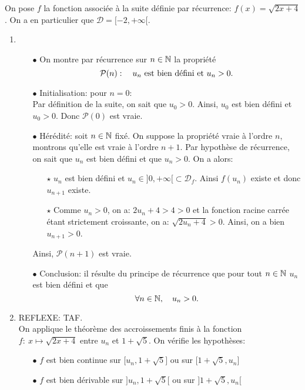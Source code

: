 \documentclass[a4paper, 11pt,reqno]{article}
\begin{document}
\begin{correction}
	On pose $f$ la fonction associ\'ee \`a la suite d\'efinie par r\'ecurrence: $f(x)=\sqrt{2x+4}$. On a en particulier que $\mathcal{D}=\lbrack -2,+\infty\lbrack$.
	\begin{enumerate}
		\item \begin{itemize}
			      \item[$\bullet$] On montre par r\'ecurrence sur $n\in\mathbb{N}$ la propri\'et\'e
			            $$\mathcal{P}(n):\quad u_n\ \hbox{est bien d\'efini et}\ u_n>0.$$
			      \item[$\bullet$]  Initialisation: pour $n=0$:\\
			            \noindent Par d\'efinition de la suite, on sait que $u_0>0$. Ainsi, $u_0$ est bien d\'efini et $u_0>0$. Donc $\mathcal{P}(0)$ est vraie.
			      \item[$\bullet$] H\'er\'edit\'e: soit $n\in\mathbb{N}$ fix\'e. On suppose la propri\'et\'e vraie \`a l'ordre $n$, montrons qu'elle est vraie \`a l'ordre $n+1$. Par hypoth\`ese de r\'ecurrence, on sait que $u_n$ est bien d\'efini et que $u_n>0$. On a alors:
			            \begin{itemize}
				            \item[$\star$] $u_n$ est bien d\'efini et $u_n\in\rbrack 0,+\infty\lbrack\subset\mathcal{D}_f$. Ainsi $f(u_n)$ existe et donc $u_{n+1}$ existe.
				            \item[$\star$]  Comme $u_n>0$, on a: $2u_n+4>4>0$ et la fonction racine carr\'ee \'etant strictement croissante, on a: $\sqrt{2u_n+4}>0$. Ainsi, on a bien $u_{n+1}>0$.
			            \end{itemize}
			            Ainsi, $\mathcal{P}(n+1)$ est vraie.
			      \item[$\bullet$]  Conclusion: il r\'esulte du principe de r\'ecurrence que pour tout $n\in\mathbb{N}$ $u_n$ est bien d\'efini et que
			            $$\forall n\in\mathbb{N},\quad u_n>0.$$
		      \end{itemize}
		\item REFLEXE: TAF.\\
		      \noindent On applique le th\'eor\`eme des accroissements finis \`a la fonction $f:\ x\mapsto \sqrt{2x+4}$ entre $u_n$ et $1+\sqrt{5}$. On v\'erifie les hypoth\`eses:
		      \begin{itemize}
			      \item[$\bullet$] $f$ est bien continue sur $\lbrack u_n,1+\sqrt{5}\rbrack$ ou sur $\lbrack 1+\sqrt{5},u_n\rbrack$
			      \item[$\bullet$]  $f$ est bien d\'erivable sur $\rbrack u_n,1+\sqrt{5}\lbrack$ ou sur $\rbrack 1+\sqrt{5},u_n\lbrack$

\end{itemize}
\end{enumerate}
\end{correction}
\end{document}
